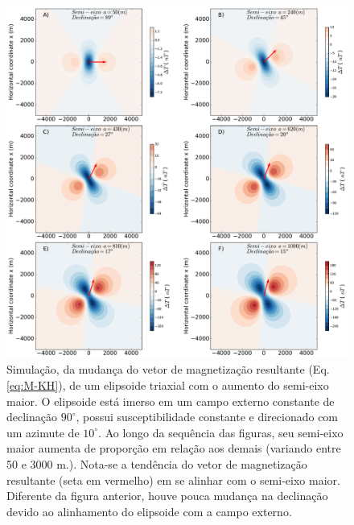 \begin{figure}[hbt!]
	\centering \includegraphics[width=16 cm,height=16 cm]{figures/ellipsoid_shape_iso}
	\caption[Simulação, da mudança do vetor de magnetização resultante (Eq. \ref{eq:M-KH}), de um elipsoide triaxial com o aumento do semi-eixo maior. O elipsoide está imerso em um campo externo constante de declinação $90^{\circ}$, possui susceptibilidade constante e direcionado com um azimute de $10^{\circ}$. Ao longo da sequência das figuras, seu semi-eixo maior aumenta de proporção em relação aos demais (variando entre 50 e 3000 m.). Nota-se a tendência do vetor de magnetização resultante (seta em vermelho) em se alinhar com o semi-eixo maior. Diferente da figura anterior, houve pouca mudança na declinação devido ao alinhamento do elipsoide com a campo externo.]
	{Simulação, da mudança do vetor de magnetização resultante (Eq. \ref{eq:M-KH}), de um elipsoide triaxial com o aumento do semi-eixo maior. O elipsoide está imerso em um campo externo constante de declinação $90^{\circ}$, possui susceptibilidade constante e direcionado com um azimute de $10^{\circ}$. Ao longo da sequência das figuras, seu semi-eixo maior aumenta de proporção em relação aos demais (variando entre 50 e 3000 m.). Nota-se a tendência do vetor de magnetização resultante (seta em vermelho) em se alinhar com o semi-eixo maior. Diferente da figura anterior, houve pouca mudança na declinação devido ao alinhamento do elipsoide com a campo externo.}
	\label{fig:ellipsoid_shape_iso10}
\end{figure}

